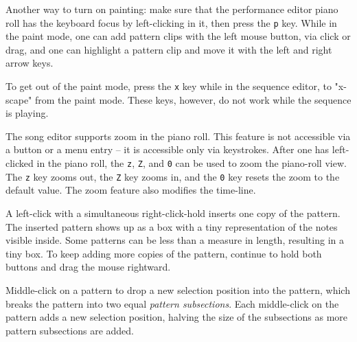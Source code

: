    Another way to turn on painting:
   make sure that the performance editor piano roll has the
   keyboard focus by left-clicking in it, then press the
   \texttt{p} key.
   While in the paint mode, one can add pattern clips with the left mouse
   button, via click or drag, and one can highlight a pattern clip and move it
   with the left and right arrow keys.


   To get out of the paint mode, press the
   \texttt{x} key while in the sequence editor, to "x-scape"
   from the paint mode.
   These keys, however, do not work while the sequence is playing.

   The song editor supports zoom in the piano roll.
   This feature is not accessible via a button or a menu
   entry -- it is accessible only via keystrokes.
   After one has left-clicked in the piano roll, the \texttt{z}, \texttt{Z},
   and \texttt{0} can be used to zoom the piano-roll view.  The \texttt{z} key
   zooms out, the \texttt{Z} key zooms in, and the \texttt{0} key resets the
   zoom to the default value.  The zoom feature also modifies the time-line.

   A left-click with a simultaneous right-click-hold inserts one copy of the
   pattern.  The inserted pattern shows up as a box with a tiny
   representation of the notes visible inside.  Some patterns can
   be less than a measure in length, resulting in a tiny box.
   To keep adding more copies of the pattern, continue to hold both buttons
   and drag the mouse rightward.

   Middle-click on a pattern to drop a new selection position into the
   pattern,
   which breaks the pattern into two equal \textsl{pattern subsections}.
   Each middle-click on the pattern adds a new selection position,
   halving the size of the subsections as more pattern subsections are
   added.

